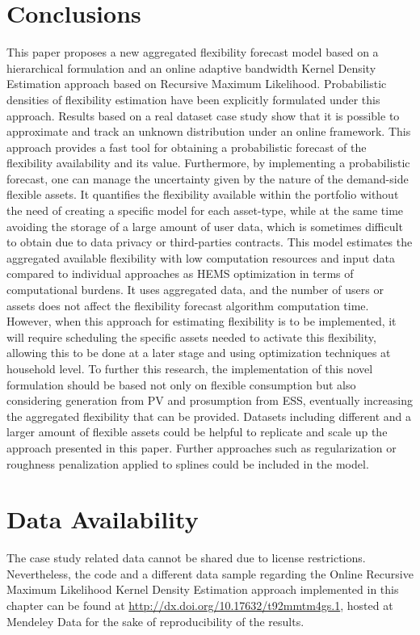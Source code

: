 \section{Conclusions} \label{Sect:Conclusions}
This paper proposes a new aggregated flexibility forecast model based on a hierarchical formulation and an online adaptive bandwidth Kernel Density Estimation approach based on Recursive Maximum Likelihood. Probabilistic densities of flexibility estimation have been explicitly formulated under this approach. Results based on a real dataset case study show that it is possible to approximate and track an unknown distribution under an online framework. This approach provides a fast tool for obtaining a probabilistic forecast of the flexibility availability and its value. Furthermore, by implementing a probabilistic forecast, one can manage the uncertainty given by the nature of the demand-side flexible assets. 
It quantifies the flexibility available within the portfolio without the need of creating a specific model for each asset-type, while at the same time avoiding the storage of a large amount of user data, which is sometimes difficult to obtain due to data privacy or third-parties contracts. 
This model estimates the aggregated available flexibility with low computation resources and input data compared to individual approaches as HEMS optimization in terms of computational burdens. It uses aggregated data, and the number of users or assets does not affect the flexibility forecast algorithm computation time. However, when this approach for estimating flexibility is to be implemented, it will require scheduling the specific assets needed to activate this flexibility, allowing this to be done at a later stage and using optimization techniques at household level. To further this research, the implementation of this novel formulation should be based not only on flexible consumption but also considering generation from PV and prosumption from ESS, eventually increasing the aggregated flexibility that can be provided. Datasets including different and a larger amount of flexible assets could be helpful to replicate and scale up the approach presented in this paper. Further approaches such as regularization or roughness penalization applied to splines could be included in the model.

\section{Data Availability}
The case study related data cannot be shared due to license restrictions. Nevertheless, the code and a different data sample regarding the Online Recursive Maximum Likelihood Kernel Density Estimation approach implemented in this chapter can be found at \url{http://dx.doi.org/10.17632/t92mmtm4gs.1}, hosted at Mendeley Data \cite{Munne-collado_dataset} for the sake of reproducibility of the results.
